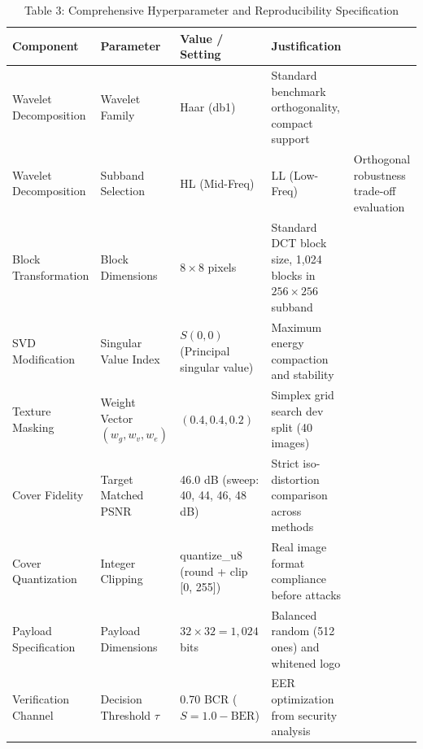 \begin{table}[htbp]
\centering
\caption{Table 3: Comprehensive Hyperparameter and Reproducibility Specification}
\begin{tabular}{llll}
\toprule
Component & Parameter & Value / Setting & Justification \\
\midrule
Wavelet Decomposition & Wavelet Family & Haar (db1) & Standard benchmark orthogonality, compact support \\
Wavelet Decomposition & Subband Selection & HL (Mid-Freq) & LL (Low-Freq) & Orthogonal robustness trade-off evaluation \\
Block Transformation & Block Dimensions & $8 \times 8$ pixels & Standard DCT block size, 1,024 blocks in $256\times 256$ subband \\
SVD Modification & Singular Value Index & $S(0, 0)$ (Principal singular value) & Maximum energy compaction and stability \\
Texture Masking & Weight Vector $(w_g, w_v, w_e)$ & $(0.4, 0.4, 0.2)$ & Simplex grid search dev split (40 images) \\
Cover Fidelity & Target Matched PSNR & 46.0 dB (sweep: 40, 44, 46, 48 dB) & Strict iso-distortion comparison across methods \\
Cover Quantization & Integer Clipping & quantize\_u8 (round + clip [0, 255]) & Real image format compliance before attacks \\
Payload Specification & Payload Dimensions & $32 \times 32 = 1,024$ bits & Balanced random (512 ones) and whitened logo \\
Verification Channel & Decision Threshold $\tau$ & 0.70 BCR ($S = 1.0 - \mathrm{BER}$) & EER optimization from security analysis \\
\bottomrule
\end{tabular}
\end{table}
